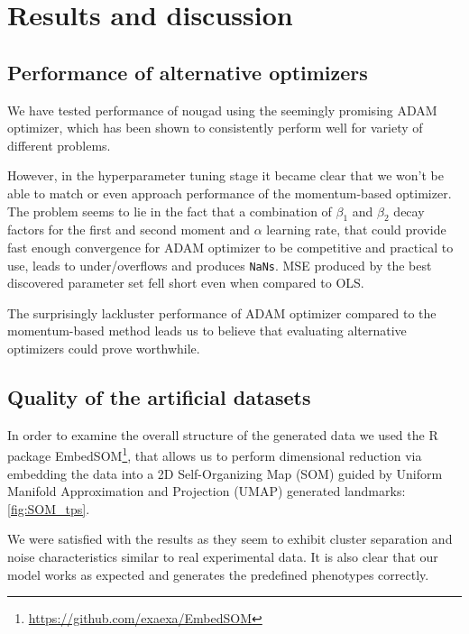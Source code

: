 \chapter{Results and discussion}

\section{Performance of alternative optimizers}
We have tested performance of nougad using the seemingly promising ADAM optimizer, which has been shown to consistently perform well for variety of different problems. 

However, in the hyperparameter tuning stage it became clear that we won't be able to match or even approach performance of the momentum-based optimizer. The problem seems to lie in the fact that a combination of $\beta_1$ and $\beta_2$ decay factors for the first and second moment and $\alpha$ learning rate, that could provide fast enough convergence for ADAM optimizer to be competitive and practical to use, leads to under/overflows and produces \texttt{NaNs}. MSE produced by the best discovered parameter set fell short even when compared to OLS.

The surprisingly lackluster performance of ADAM optimizer compared to the momentum-based method leads us to believe that evaluating alternative optimizers could prove worthwhile.

\section{Quality of the artificial datasets}

In order to examine the overall structure of the generated data we used the R package EmbedSOM\footnote{\url{https://github.com/exaexa/EmbedSOM}}, that allows us to perform dimensional reduction via embedding the data into a 2D Self-Organizing Map (SOM) guided by Uniform Manifold Approximation and Projection (UMAP) generated landmarks: \cref{fig:SOM_tps}.

We were satisfied with the results as they seem to exhibit cluster separation and noise characteristics similar to real experimental data. It is also clear that our model works as expected and generates the predefined phenotypes correctly.

